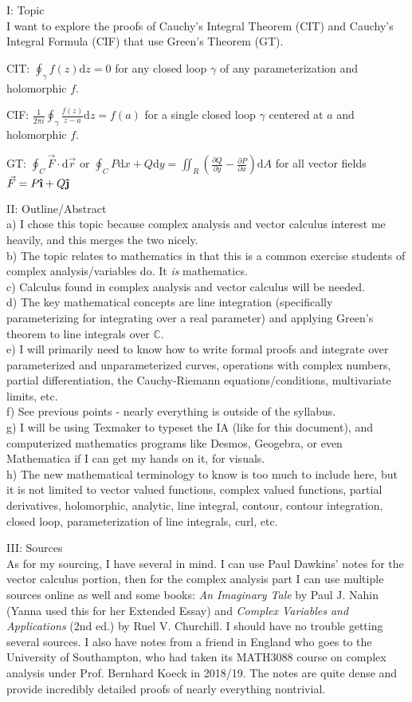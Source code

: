 \documentclass[11pt]{article}
\newcommand{\ihat}{\boldsymbol{\hat{\textbf{\i}}}}
\newcommand{\jhat}{\boldsymbol{\hat{\textbf{\j}}}}
\begin{document}
I: Topic\\I want to explore the proofs of Cauchy's Integral Theorem (CIT) and Cauchy's Integral Formula (CIF) that use Green's Theorem (GT).

CIT: $\displaystyle{\oint_{\gamma} f(z)\mathrm{d}z = 0}$ for any closed loop $\gamma$ of any parameterization and holomorphic $f$.

CIF: $\displaystyle{\frac{1}{2\pi i}\oint_{\gamma}\frac{f(z)}{z-a}\mathrm{d}z = f(a)}$ for a single 	 closed loop $\gamma$ centered at $a$ and holomorphic $f$.

GT: $\displaystyle{\oint_C \vec{F}\cdot\mathrm{d}\vec{r}}$ or $\displaystyle{\oint_C P\mathrm{d}x + Q\mathrm{d}y = \iint_R \left(\frac{\partial Q}{\partial y} - \frac{\partial P}{\partial x}\right) \mathrm{d}A}$ for all vector fields $\vec{F} = P\ihat + Q\jhat$

II: Outline/Abstract\\a) I chose this topic because complex analysis and vector calculus interest me heavily, and this merges the two nicely.\\b) The topic relates to mathematics in that this is a common exercise students of complex analysis/variables do. It \textit{is} mathematics.\\c) Calculus found in complex analysis and vector calculus will be needed.\\d) The key mathematical concepts are line integration (specifically parameterizing for integrating over a real parameter) and applying Green's theorem to line integrals over $\mathbb{C}$.\\e) I will primarily need to know how to write formal proofs and integrate over parameterized and unparameterized curves, operations with complex numbers, partial differentiation, the Cauchy-Riemann equations/conditions, multivariate limits, etc.\\f) See previous points - nearly everything is outside of the syllabus.\\g) I will be using Texmaker to typeset the IA (like for this document), and computerized mathematics programs like Desmos, Geogebra, or even Mathematica if I can get my hands on it, for visuals.\\h) The new mathematical terminology to know is too much to include here, but it is not limited to vector valued functions, complex valued functions, partial derivatives, holomorphic, analytic, line integral, contour, contour integration, closed loop, parameterization of line integrals, curl, etc.

III: Sources\\As for my sourcing, I have several in mind. I can use Paul Dawkins' notes for the vector calculus portion, then for the complex analysis part I can use multiple sources online as well and some books: \textit{An Imaginary Tale} by Paul J. Nahin (Yanna used this for her Extended Essay) and \textit{Complex Variables and Applications} (2nd ed.) by Ruel V. Churchill. I should have no trouble getting several sources. I also have notes from a friend in England who goes to the University of Southampton, who had taken its MATH3088 course on complex analysis under Prof. Bernhard Koeck in 2018/19. The notes are quite dense and provide incredibly detailed proofs of nearly everything nontrivial.
\end{document}
